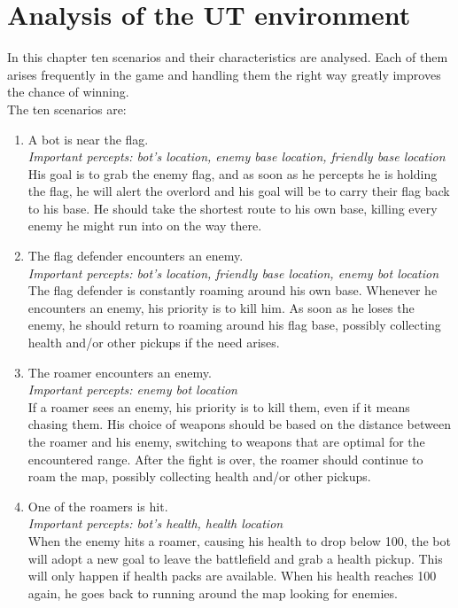 \chapter{Analysis of the UT environment}
In this chapter ten scenarios and their characteristics are analysed. Each of them arises frequently in the game and handling them the right way greatly improves the chance of winning.\\
The ten scenarios are:
\begin{enumerate}
	\item A bot is near the flag. \\
	\textit{Important percepts: bot's location, enemy base location, friendly base location} \\
	His goal is to grab the enemy flag, and as soon as he percepts he is holding the flag, he will alert the overlord and his goal will be to carry their flag back to his base. He should take the shortest route to his own base, killing every enemy he might run into on the way there.
	\item The flag defender encounters an enemy. \\
	\textit{Important percepts: bot's location, friendly base location, enemy bot location} \\
	The flag defender is constantly roaming around his own base. Whenever he encounters an enemy, his priority is to kill him. As soon as he loses the enemy, he should return to roaming around his flag base, possibly collecting health and/or other pickups if the need arises.
	\item The roamer encounters an enemy. \\
	\textit{Important percepts: enemy bot location} \\
	If a roamer sees an enemy, his priority is to kill them, even if it means chasing them. His choice of weapons should be based on the distance between the roamer and his enemy, switching to weapons that are optimal for the encountered range. After the fight is over, the roamer should continue to roam the map, possibly collecting health and/or other pickups.
	\item One of the roamers is hit. \\
	\textit{Important percepts: bot's health, health location} \\
	When the enemy hits a roamer, causing his health to drop below 100, the bot will adopt a new goal to leave the battlefield and grab a health pickup. This will only happen if health packs are available. When his health reaches 100 again, he goes back to running around the map looking for enemies.

\end{enumerate}
